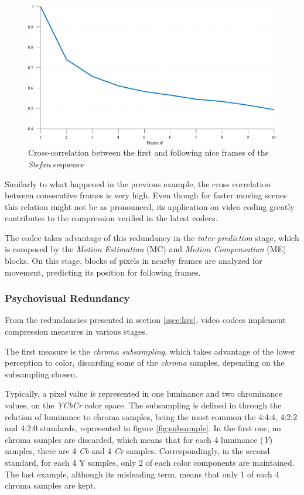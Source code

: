 \begin{figure}[h]
    \centering
    \includegraphics[width=\textwidth]{Sections/3AV1/Diagrams/intercorr.eps}
    \caption{Cross-correlation between the first and following nice frames of the \emph{Stefan} sequence}
    \label{fig:crosscorr}
\end{figure}

Similarly to what happened in the previous example, the cross correlation between consecutive frames is very high. Even though for faster moving scenes this relation might not be as pronounced, its application on video coding greatly contributes to the compression verified in the latest codecs. 

The codec takes advantage of this redundancy in the \emph{inter-prediction} stage, which is composed by the \emph{Motion Estimation} (MC) and \emph{Motion Compensation} (ME) blocks. On this stage, blocks of pixels in nearby frames are analyzed for movement, predicting its position for following frames.

\subsubsection{Psychovisual Redundancy}

From the redundancies presented in section \ref{ssec:hvs}, video codecs implement compression measures in various stages.

The first measure is the \emph{chroma subsampling}, which takes advantage of the lower perception to color, discarding some of the \emph{chroma} samples, depending on the subsampling chosen.

Typically, a pixel value is represented in one luminance and two chrominance values, on the \emph{YCbCr} color space. The subsampling is defined in through the relation of luminance to chroma samples, being the most common the 4:4:4, 4:2:2 and 4:2:0 standards, represented in figure \ref{fig:subsample}. In the first one, no chroma samples are discarded, which means that for each 4 luminance (\emph{Y}) samples, there are 4 \emph{Cb} and 4 \emph{Cr} samples. Correspondingly, in the second standard, for each 4 Y samples, only 2 of each color components are maintained. The last example, although its misleading term, means that only 1 of each 4 chroma samples are kept.

